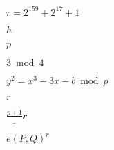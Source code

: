 \documentclass{article}
\begin{document}
$ r=2^{159}+2^{17}+1 $
\pagebreak

$ h $
\pagebreak

$ p $
\pagebreak

$3 \bmod{4}$
\pagebreak

$ y^2= x^3-3x-b \bmod{p} $
\pagebreak

$ r $
\pagebreak

$ \frac{p + 1}_{r} $
\pagebreak

$ e(P, Q)^{r} $
\pagebreak
\end{document}
